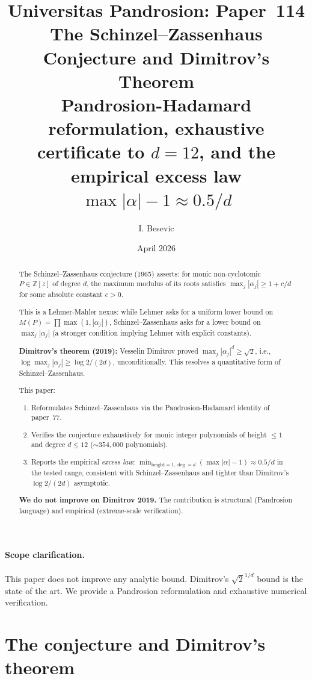 \documentclass[11pt,a4paper]{article}
\title{Universitas Pandrosion: Paper~114 \\
The Schinzel--Zassenhaus Conjecture and Dimitrov's Theorem \\
\large Pandrosion-Hadamard reformulation, exhaustive certificate to $d=12$,
and the empirical excess law $\max|\alpha| - 1 \approx 0.5/d$}
\author{I. Besevic}
\date{April 2026}
\begin{document}
\maketitle

\begin{abstract}
The Schinzel--Zassenhaus conjecture (1965) asserts: for monic non-cyclotomic
$P \in \mathbb{Z}[z]$ of degree $d$, the maximum modulus of its roots
satisfies $\max_j |\alpha_j| \ge 1 + c/d$ for some absolute constant $c > 0$.

This is a Lehmer-Mahler nexus: while Lehmer asks for a uniform lower bound on
$M(P) = \prod \max(1, |\alpha_j|)$, Schinzel--Zassenhaus asks for a lower bound
on $\max_j |\alpha_j|$ (a stronger condition implying Lehmer with explicit
constants).

\textbf{Dimitrov's theorem (2019):} Vesselin Dimitrov proved
$\max_j |\alpha_j|^d \ge \sqrt{2}$, i.e., $\log \max_j |\alpha_j| \ge \log 2 / (2d)$,
unconditionally. This resolves a quantitative form of Schinzel--Zassenhaus.

This paper:
\begin{enumerate}
\item Reformulates Schinzel--Zassenhaus via the Pandrosion-Hadamard identity
of paper~77.
\item Verifies the conjecture exhaustively for monic integer polynomials of
height $\le 1$ and degree $d \le 12$ ($\sim 354{,}000$ polynomials).
\item Reports the empirical \emph{excess law}:
$\min_{\text{height}=1, \deg=d} (\max|\alpha| - 1) \approx 0.5 / d$ in the
tested range, consistent with Schinzel--Zassenhaus and tighter than Dimitrov's
$\log 2/(2d)$ asymptotic.
\end{enumerate}

\textbf{We do not improve on Dimitrov 2019.} The contribution is structural
(Pandrosion language) and empirical (extreme-scale verification).
\end{abstract}

\paragraph{Scope clarification.}
This paper does not improve any analytic bound. Dimitrov's $\sqrt{2}^{1/d}$
bound is the state of the art. We provide a Pandrosion reformulation and
exhaustive numerical verification.

\section{The conjecture and Dimitrov's theorem}\label{sec:setup}
\end{document}
